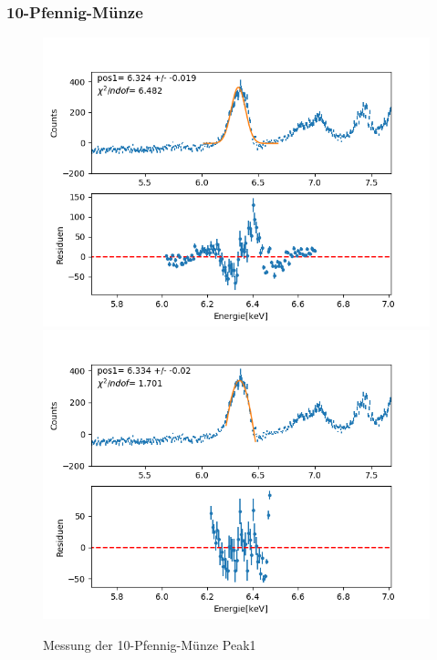 \documentclass[12pt,a4paper]{article}
\begin{document}
\subsubsection{10-Pfennig-Münze}
\begin{figure}[H]
\centering
\includegraphics[scale=0.49]{Bilder/roentgen_spektren/pfennig/pfen1_1.png}
\includegraphics[scale=0.49]{Bilder/roentgen_spektren/pfennig/pfen1_2.png}
\caption{Messung der 10-Pfennig-Münze Peak1}
\end{figure}
\end{document}
